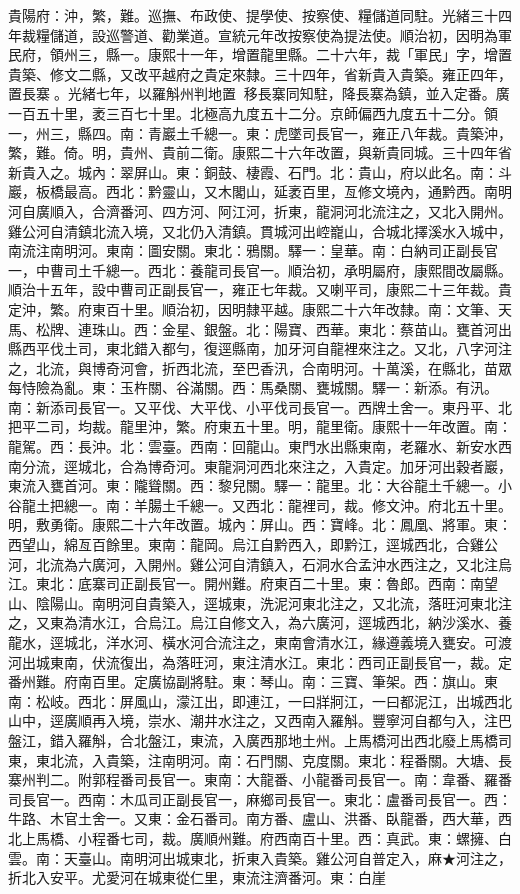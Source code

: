\begin{pinyinscope}
貴陽府：沖，繁，難。巡撫、布政使、提學使、按察使、糧儲道同駐。光緒三十四年裁糧儲道，設巡警道、勸業道。宣統元年改按察使為提法使。順治初，因明為軍民府，領州三，縣一。康熙十一年，增置龍里縣。二十六年，裁「軍民」字，增置貴築、修文二縣，又改平越府之貴定來隸。三十四年，省新貴入貴築。雍正四年，置長寨。光緒七年，以羅斛州判地置，移長寨同知駐，降長寨為鎮，並入定番。廣一百五十里，袤三百七十里。北極高九度五十二分。京師偏西九度五十二分。領一，州三，縣四。南：青巖土千總一。東：虎墜司長官一，雍正八年裁。貴築沖，繁，難。倚。明，貴州、貴前二衛。康熙二十六年改置，與新貴同城。三十四年省新貴入之。城內：翠屏山。東：銅鼓、棲霞、石門。北：貴山，府以此名。南：斗巖，板橋最高。西北：黔靈山，又木閣山，延袤百里，亙修文境內，通黔西。南明河自廣順入，合濟番河、四方河、阿江河，折東，龍洞河北流注之，又北入開州。雞公河自清鎮北流入境，又北仍入清鎮。貫城河出崆巃山，合城北擇溪水入城中，南流注南明河。東南：圖安關。東北：鴉關。驛一：皇華。南：白納司正副長官一，中曹司土千總一。西北：養龍司長官一。順治初，承明屬府，康熙間改屬縣。順治十五年，設中曹司正副長官一，雍正七年裁。又喇平司，康熙二十三年裁。貴定沖，繁。府東百十里。順治初，因明隸平越。康熙二十六年改隸。南：文筆、天馬、松牌、連珠山。西：金星、銀盤。北：陽寶、西華。東北：蔡苗山。甕首河出縣西平伐土司，東北錯入都勻，復逕縣南，加牙河自龍裡來注之。又北，八字河注之，北流，與博奇河會，折西北流，至巴香汛，合南明河。十萬溪，在縣北，苗眾每恃險為亂。東：玉杵關、谷滿關。西：馬桑關、甕城關。驛一：新添。有汛。南：新添司長官一。又平伐、大平伐、小平伐司長官一。西牌土舍一。東丹平、北把平二司，均裁。龍里沖，繁。府東五十里。明，龍里衛。康熙十一年改置。南：龍駕。西：長沖。北：雲臺。西南：回龍山。東門水出縣東南，老羅水、新安水西南分流，逕城北，合為博奇河。東龍洞河西北來注之，入貴定。加牙河出穀者巖，東流入甕首河。東：隴聳關。西：黎兒關。驛一：龍里。北：大谷龍土千總一。小谷龍土把總一。南：羊腸土千總一。又西北：龍裡司，裁。修文沖。府北五十里。明，敷勇衛。康熙二十六年改置。城內：屏山。西：寶峰。北：鳳凰、將軍。東：西望山，綿亙百餘里。東南：龍岡。烏江自黔西入，即黔江，逕城西北，合雞公河，北流為六廣河，入開州。雞公河自清鎮入，石洞水合孟沖水西注之，又北注烏江。東北：底寨司正副長官一。開州難。府東百二十里。東：魯郎。西南：南望山、陰陽山。南明河自貴築入，逕城東，洗泥河東北注之，又北流，落旺河東北注之，又東為清水江，合烏江。烏江自修文入，為六廣河，逕城西北，納沙溪水、養龍水，逕城北，洋水河、橫水河合流注之，東南會清水江，緣遵義境入甕安。可渡河出城東南，伏流復出，為落旺河，東注清水江。東北：西司正副長官一，裁。定番州難。府南百里。定廣協副將駐。東：琴山。南：三寶、筆架。西：旗山。東南：松岐。西北：屏風山，濛江出，即連江，一曰牂牁江，一曰都泥江，出城西北山中，逕廣順再入境，崇水、潮井水注之，又西南入羅斛。豐寧河自都勻入，注巴盤江，錯入羅斛，合北盤江，東流，入廣西那地土州。上馬橋河出西北廢上馬橋司東，東北流，入貴築，注南明河。南：石門關、克度關。東北：程番關。大塘、長寨州判二。附郭程番司長官一。東南：大龍番、小龍番司長官一。南：韋番、羅番司長官一。西南：木瓜司正副長官一，麻鄉司長官一。東北：盧番司長官一。西：牛路、木官土舍一。又東：金石番司。南方番、盧山、洪番、臥龍番，西大華，西北上馬橋、小程番七司，裁。廣順州難。府西南百十里。西：真武。東：螺擁、白雲。南：天臺山。南明河出城東北，折東入貴築。雞公河自普定入，麻★河注之，折北入安平。尤愛河在城東從仁里，東流注濟番河。東：白崖
\end{pinyinscope}
